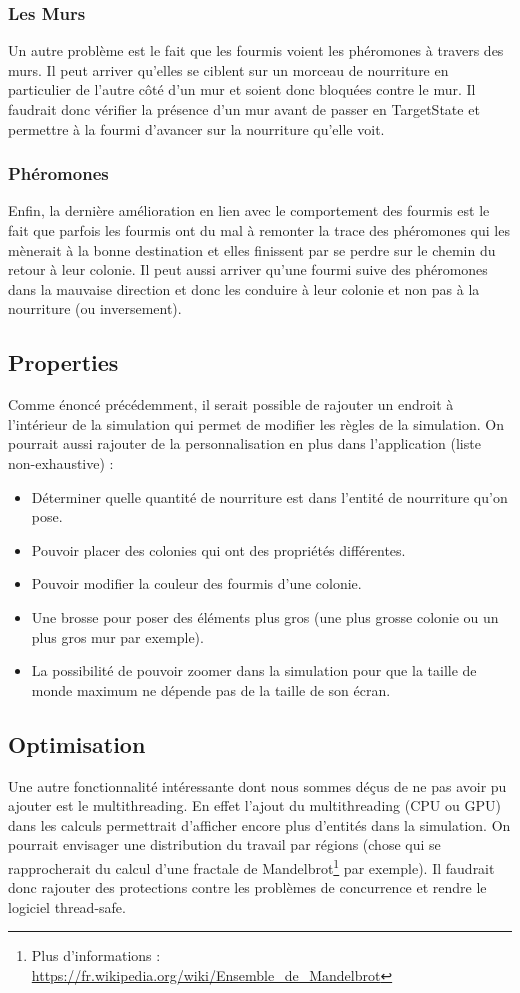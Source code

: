 \documentclass{EPUProjetDi}
\begin{document}
\subsubsection{Les Murs}
Un autre problème est le fait que les fourmis voient les phéromones à travers des murs. Il peut arriver qu'elles se ciblent sur un morceau de 
nourriture en particulier de l'autre côté d'un mur et soient donc bloquées contre le mur.
Il faudrait donc vérifier la présence d'un mur avant de passer en TargetState et permettre à la fourmi d'avancer sur la nourriture qu'elle voit.

\subsubsection{Phéromones}
Enfin, la dernière amélioration en lien avec le comportement des fourmis est le fait que parfois les fourmis ont du mal à remonter la trace des phéromones qui les mènerait à la bonne destination et elles finissent par
se perdre sur le chemin du retour à leur colonie. Il peut aussi arriver qu'une fourmi suive des phéromones dans la mauvaise direction et donc les conduire à leur colonie et non pas à la nourriture (ou inversement).

\subsection{Properties}
Comme énoncé précédemment, il serait possible de rajouter un endroit à l'intérieur de la simulation qui permet de modifier les règles de la simulation.
On pourrait aussi rajouter de la personnalisation en plus dans l'application (liste non-exhaustive) : 
\begin{itemize}
    \item Déterminer quelle quantité de nourriture est dans l'entité de nourriture qu'on pose.
    \item Pouvoir placer des colonies qui ont des propriétés différentes.
    \item Pouvoir modifier la couleur des fourmis d'une colonie.
    \item Une brosse pour poser des éléments plus gros (une plus grosse colonie ou un plus gros mur par exemple).
    \item La possibilité de pouvoir zoomer dans la simulation pour que la taille de monde maximum ne dépende pas de la taille de son écran.
\end{itemize}

\subsection{Optimisation}
Une autre fonctionnalité intéressante dont nous sommes déçus de ne pas avoir pu ajouter est le multithreading. En effet l'ajout du multithreading (CPU ou GPU) dans les calculs permettrait d'afficher 
encore plus d'entités dans la simulation. On pourrait envisager une distribution du travail par régions 
(chose qui se rapprocherait du calcul d'une fractale de Mandelbrot\footnote{Plus d'informations : \url{https://fr.wikipedia.org/wiki/Ensemble_de_Mandelbrot}} par exemple).
Il faudrait donc rajouter des protections contre les problèmes de concurrence et rendre le logiciel thread-safe. 
\end{document}
